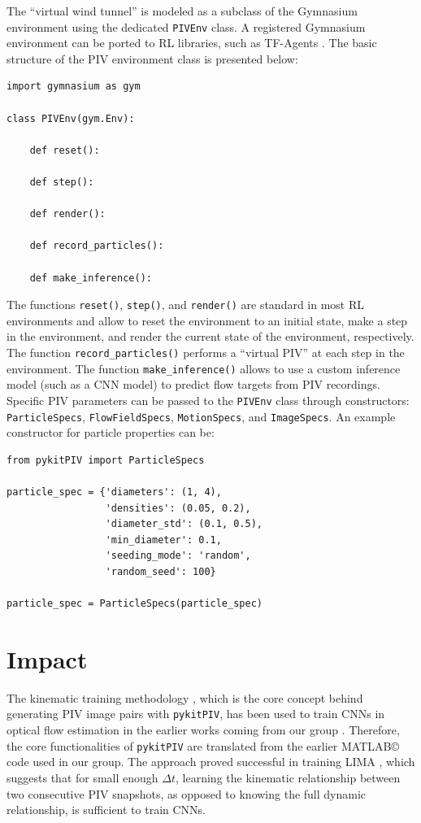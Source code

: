 \documentclass[a4paper,fleqn]{cas-dc}
\begin{document}
The ``virtual wind tunnel'' is modeled as a subclass of the Gymnasium environment \cite{brockman2016openai} using the dedicated \texttt{PIVEnv} class. A registered Gymnasium environment can be ported to RL libraries, such as TF-Agents \cite{TFAgents}. The basic structure of the PIV environment class is presented below:
\lstset{language=Python}
\begin{lstlisting}
import gymnasium as gym

class PIVEnv(gym.Env):

	def reset():

	def step():

	def render():

	def record_particles():

	def make_inference():

\end{lstlisting}
The functions \texttt{reset()}, \texttt{step()}, and \texttt{render()} are standard in most RL environments and allow to reset the environment to an initial state, make a step in the environment, and render the current state of the environment, respectively.
The function \texttt{record\_particles()} performs a ``virtual PIV'' at each step in the environment. The function \texttt{make\_inference()} allows to use a custom inference model (such as a CNN model) to predict flow targets from PIV recordings. 
Specific PIV parameters can be passed to the \texttt{PIVEnv} class through constructors: \\
\texttt{ParticleSpecs}, \texttt{FlowFieldSpecs}, \texttt{MotionSpecs}, and \texttt{ImageSpecs}. An example constructor for particle properties can be:
\lstset{language=Python}
\begin{lstlisting}
from pykitPIV import ParticleSpecs

particle_spec = {'diameters': (1, 4),
                 'densities': (0.05, 0.2),
                 'diameter_std': (0.1, 0.5),
                 'min_diameter': 0.1,
                 'seeding_mode': 'random',
                 'random_seed': 100}
                 
particle_spec = ParticleSpecs(particle_spec)
\end{lstlisting}



\section{Impact} \label{sec:results}

The kinematic training methodology \cite{manickathan2022kinematic}, which is the core concept behind generating PIV image pairs with \texttt{pykitPIV}, has been used to train CNNs in optical flow estimation in the earlier works coming from our group \cite{manickathan2022kinematic, manickathan2023lightweight, mucignat2023lightweight}. 
Therefore, the core functionalities of \texttt{pykitPIV} are translated from the earlier MATLAB\copyright \, code used in our group.
The approach proved successful in training LIMA \cite{manickathan2022kinematic}, which suggests that for small enough $\Delta t$, learning the kinematic relationship between two consecutive PIV snapshots, as opposed to knowing the full dynamic relationship, is sufficient to train CNNs.
\end{document}
